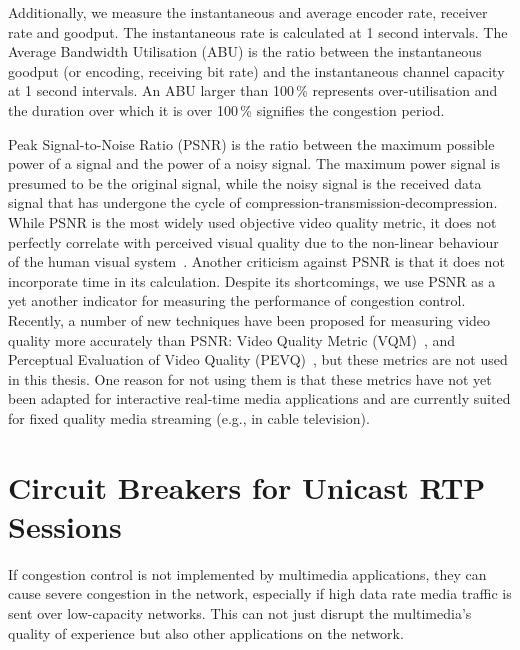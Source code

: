 Additionally, we measure the instantaneous and average encoder rate, receiver
rate and goodput. The instantaneous rate is calculated at 1 second intervals. The
Average Bandwidth Utilisation (ABU) is the ratio between the instantaneous
goodput (or encoding, receiving bit rate) and the instantaneous channel
capacity at 1 second intervals. An ABU larger than 100\,\% represents over-utilisation
and the duration over which it is over 100\,\% signifies the congestion period.


Peak Signal-to-Noise Ratio (PSNR) is the ratio between the maximum possible
power of a signal and the power of a noisy signal. The maximum power signal is
presumed to be the original signal, while the noisy signal is the received data
signal that has undergone the cycle of compression-transmission-decompression.
While PSNR is the most widely used objective video quality metric, it does not
perfectly correlate with perceived visual quality due to the non-linear
behaviour of the human visual system~\cite{itu-t-j247}. Another criticism
against PSNR is that it does not incorporate time in its calculation. Despite
its shortcomings, we use PSNR as a yet another indicator for measuring the
performance of congestion control. Recently, a number of new techniques have
been proposed for measuring video quality more accurately than PSNR:
Video Quality Metric (VQM)~\cite{itu-t-j144}, and Perceptual Evaluation
of Video Quality (PEVQ)~\cite{itu-t-j247, itu-t-j341}, but these metrics are not
used in this thesis. One reason for not using them is that these metrics have
not yet been adapted for interactive real-time media applications and are
currently suited for fixed quality media streaming (e.g., in cable television).



\section{Circuit Breakers for Unicast RTP Sessions}

If congestion control is not implemented by multimedia applications, they can
cause severe congestion in the network, especially if high data rate media
traffic is sent over low-capacity networks. This can not just disrupt the
multimedia's quality of experience but also other applications on the network.


